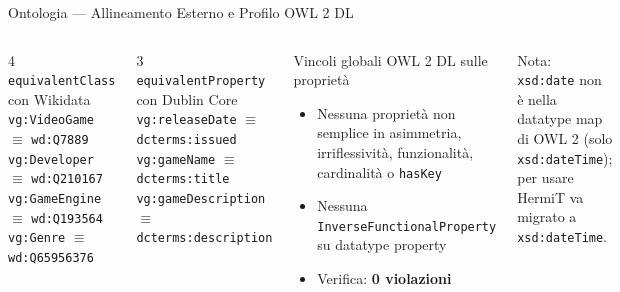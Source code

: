 \documentclass[aspectratio=169,11pt]{beamer}
\begin{document}
\begin{frame}{Ontologia --- Allineamento Esterno e Profilo OWL 2 DL}
  \begin{columns}[T]
    \begin{block}{4 \texttt{equivalentClass} con Wikidata}
      \small
      \texttt{vg:VideoGame} $\equiv$ \texttt{wd:Q7889} \\
      \texttt{vg:Developer} $\equiv$ \texttt{wd:Q210167} \\
      \texttt{vg:GameEngine} $\equiv$ \texttt{wd:Q193564} \\
      \texttt{vg:Genre} $\equiv$ \texttt{wd:Q65956376}
    \end{block}

    \begin{block}{3 \texttt{equivalentProperty} con Dublin Core}
      \small
      \texttt{vg:releaseDate} $\equiv$ \texttt{dcterms:issued} \\
      \texttt{vg:gameName} $\equiv$ \texttt{dcterms:title} \\
      \texttt{vg:gameDescription} $\equiv$ \texttt{dcterms:description}
    \end{block}

    \begin{block}{Vincoli globali OWL 2 DL sulle propriet\`a}
      \small
      \begin{itemize}
        \item Nessuna propriet\`a non semplice in asimmetria, irriflessivit\`a,
          funzionalit\`a, cardinalit\`a o \texttt{hasKey}
        \item Nessuna \texttt{InverseFunctionalProperty} su datatype property
        \item Verifica: \textbf{0 violazioni}
      \end{itemize}
    \end{block}
    {\footnotesize Nota: \texttt{xsd:date} non \`e nella datatype map di OWL 2 (solo
    \texttt{xsd:dateTime}); per usare HermiT va migrato a \texttt{xsd:dateTime}.\par}
  \end{columns}
\end{frame}
\end{document}
